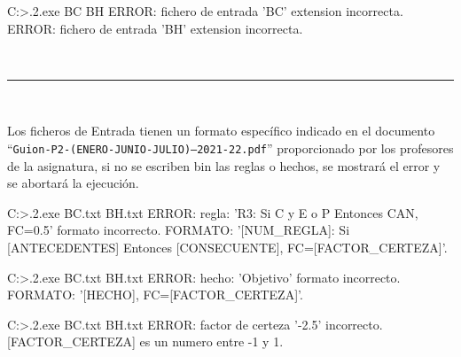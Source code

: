 \begin{listing}[style=consola]
C:\Users\ElenaPerez\SBR\bin\Debug>.\practica2.exe BC BH
ERROR: fichero de entrada 'BC' extension incorrecta.
ERROR: fichero de entrada 'BH' extension incorrecta.
\end{listing}
\newpage
\begin{center}
	{\fboxrule=4pt } \\
	\setcounter{chapter}{3}
	\setcounter{section}{0}
	\rule{15cm}{0pt} \\
\end{center}
\par Los ficheros de Entrada tienen un formato específico indicado en el documento \\
``\texttt{Guion-P2-(ENERO-JUNIO-JULIO)--2021-22.pdf}'' proporcionado por los profesores de la asignatura, si no se escriben bin las reglas o
hechos, se mostrará el error y se abortará la ejecución.
\begin{listing}[style=consola]
C:\Users\ElenaPerez\SBR\bin\Debug>.\practica2.exe BC.txt BH.txt
ERROR: regla: 'R3: Si C y E o P Entonces CAN, FC=0.5' formato incorrecto.
FORMATO: '[NUM_REGLA]: Si [ANTECEDENTES] Entonces [CONSECUENTE], FC=[FACTOR_CERTEZA]'.  
\end{listing}
\begin{listing}[style=consola]
C:\Users\ElenaPerez\SBR\bin\Debug>.\practica2.exe BC.txt BH.txt
ERROR: hecho: 'Objetivo' formato incorrecto.
FORMATO: '[HECHO], FC=[FACTOR_CERTEZA]'.
\end{listing}
\begin{listing}[style=consola]
C:\Users\ElenaPerez\SBR\bin\Debug>.\practica2.exe BC.txt BH.txt
ERROR: factor de certeza '-2.5' incorrecto.
[FACTOR_CERTEZA] es un numero entre -1 y 1.
\end{listing}

